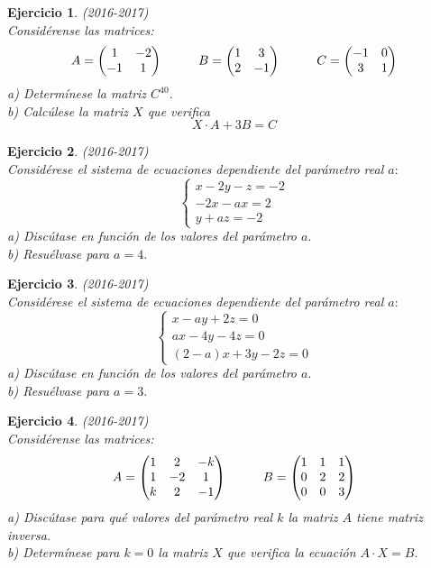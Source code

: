 \documentclass[12pt, a4paper]{amsart}
\newtheorem{ejer}{Ejercicio}
\begin{document}
\begin{ejer}\em (2016-2017)\\
Considérense las matrices:
\[A=\begin{pmatrix}
1 & -2 
\\ -1 & 1
\end{pmatrix} \hspace*{1cm} B=\begin{pmatrix}
1 & 3
\\ 2 & -1
\end{pmatrix} \hspace*{1cm} C=\begin{pmatrix}
-1 & 0
\\ 3 & 1
\end{pmatrix}\]
a) Determínese la matriz $C^{40}.$\\
b) Calcúlese la matriz $X$ que verifica
\[X\cdot A + 3B=C\]
\end{ejer}

\begin{ejer}\em (2016-2017)\\
Considérese el sistema de ecuaciones dependiente del parámetro real $a:$
\[
\left \{ \begin{matrix}
x -2y -z=-2
\\ -2x -ax =2
\\  y+az=-2
\end{matrix}  \right.
\]
a) Discútase en función de los valores del parámetro $a.$\\
b) Resuélvase para $a = 4.$
\end{ejer}

\begin{ejer}\em (2016-2017)\\
Considérese el sistema de ecuaciones dependiente del parámetro real $a:$
\[
\left \{ \begin{matrix}
x -ay+2z=0
\\ ax-4y -4z=0
\\ (2-a)x+3y-2z=0
\end{matrix}  \right.
\]
a) Discútase en función de los valores del parámetro $a.$\\
b) Resuélvase para $a = 3.$
\end{ejer}

\begin{ejer}\em (2016-2017)\\
Considérense las matrices:
\[
A=\begin{pmatrix}
1 & 2 & -k
\\ 1 & -2 & 1
\\ k & 2 & -1
\end{pmatrix} \hspace*{1cm} B=\begin{pmatrix}
1 & 1 & 1
\\ 0 & 2 & 2
\\0 & 0 & 3
\end{pmatrix}\]
a) Discútase para qué valores del parámetro real $k$ la matriz $A$ tiene matriz inversa.\\
b) Determínese para $k = 0$ la matriz $X$ que verifica la ecuación $A \cdot X = B.$
\end{ejer}
\end{document}
